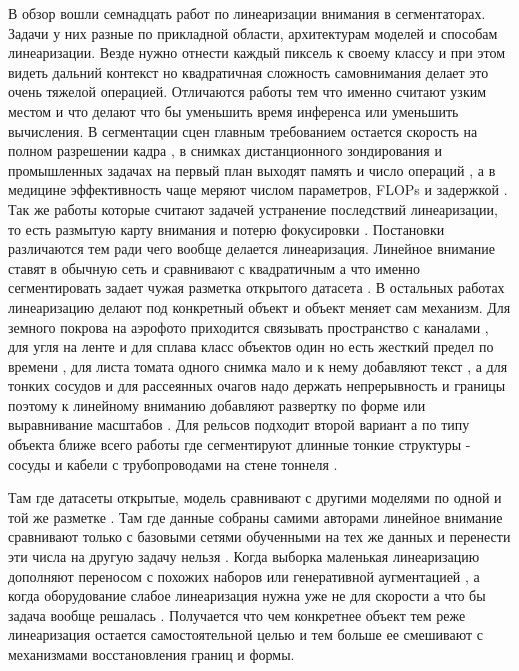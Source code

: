 \documentclass[areasetadvanced]{scrartcl}
\begin{document}
	В обзор вошли семнадцать работ по линеаризации внимания в сегментаторах. Задачи у них разные по прикладной области, архитектурам моделей и способам линеаризации. 
	Везде нужно отнести каждый пиксель к своему классу и при этом видеть дальний контекст но квадратичная сложность самовнимания делает это очень тяжелой операцией. 
	Отличаются работы тем что именно считают узким местом и что делают что бы уменьшить время инференса или уменьшить вычисления. В сегментации сцен главным требованием 
	остается скорость на полном разрешении кадра \cite{lsnet, rtlinearformer}, в снимках дистанционного зондирования и промышленных задачах на первый план выходят 
	память и число операций \cite{glanet, abcfnet}, а в медицине эффективность чаще меряют числом параметров, FLOPs и задержкой
	\cite{mlformer, snakerwkv, uuekan}. Так же работы которые считают задачей устранение последствий линеаризации, то есть размытую
	карту внимания и потерю фокусировки \cite{hlsmvit, uuekan}.
	Постановки различаются тем ради чего вообще делается линеаризация. Линейное внимание ставят в обычную сеть и
	сравнивают с квадратичным а что именно сегментировать задает чужая разметка открытого датасета
	\cite{segformer, lsnet, rtlinearformer, hlsmvit, mlformer, masavmunet, cltmambaseg, uuekan}. В остальных работах линеаризацию делают под
	конкретный объект и объект меняет сам механизм. Для земного покрова на аэрофото приходится связывать пространство с каналами
	\cite{glanet, abcfnet}, для угля на ленте и для сплава класс объектов один но есть жесткий предел по времени \cite{lptnet, caunet}, для листа
	томата одного снимка мало и к нему добавляют текст \cite{mslcfnet}, а для тонких сосудов и для рассеянных очагов надо держать непрерывность и
	границы поэтому к линейному вниманию добавляют развертку по форме или выравнивание масштабов \cite{snakerwkv, pmp}. Для рельсов подходит второй
	вариант а по типу объекта ближе всего работы где сегментируют длинные тонкие структуры - сосуды \cite{snakerwkv} и кабели с трубопроводами на
	стене тоннеля \cite{fesssam}.

	Там где датасеты открытые, модель сравнивают с другими моделями по одной и той же разметке
	\cite{segformer, lsnet, rtlinearformer, hlsmvit, masavmunet, cltmambaseg, uuekan}. Там где данные собраны самими авторами линейное внимание
	сравнивают только с базовыми сетями обученными на тех же данных и перенести эти числа на другую задачу нельзя
	\cite{lptnet, caunet, mslcfnet, fesssam, mlformer, pmp}. Когда выборка маленькая линеаризацию дополняют
	переносом с похожих наборов \cite{wtpmilaunet} или генеративной аугментацией \cite{cltmambaseg}, а когда оборудование слабое линеаризация нужна
	уже не для скорости а что бы задача вообще решалась \cite{pmp, lptnet}. Получается что чем конкретнее объект тем реже линеаризация остается
	самостоятельной целью и тем больше ее смешивают с механизмами восстановления границ и формы. 
\end{document}
